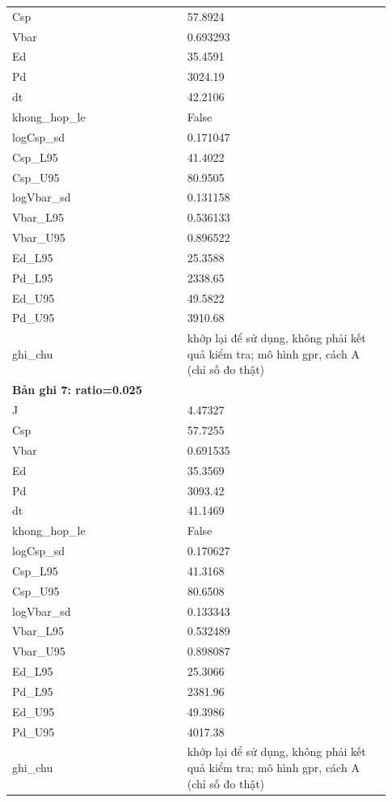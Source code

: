 \begin{longtable}{p{0.43\linewidth}p{0.50\linewidth}}
Csp & 57.8924 \\
Vbar & 0.693293 \\
Ed & 35.4591 \\
Pd & 3024.19 \\
dt & 42.2106 \\
khong\_\allowbreak hop\_\allowbreak le & False \\
logCsp\_\allowbreak sd & 0.171047 \\
Csp\_\allowbreak L95 & 41.4022 \\
Csp\_\allowbreak U95 & 80.9505 \\
logVbar\_\allowbreak sd & 0.131158 \\
Vbar\_\allowbreak L95 & 0.536133 \\
Vbar\_\allowbreak U95 & 0.896522 \\
Ed\_\allowbreak L95 & 25.3588 \\
Pd\_\allowbreak L95 & 2338.65 \\
Ed\_\allowbreak U95 & 49.5822 \\
Pd\_\allowbreak U95 & 3910.68 \\
ghi\_\allowbreak chu & khớp lại để sử dụng, không phải kết quả kiểm tra; mô hình gpr, cách A (chỉ số đo thật) \\
\midrule
\multicolumn{2}{p{0.95\linewidth}}{\textbf{Bản ghi 7: ratio=0.025}} \\
J & 4.47327 \\
Csp & 57.7255 \\
Vbar & 0.691535 \\
Ed & 35.3569 \\
Pd & 3093.42 \\
dt & 41.1469 \\
khong\_\allowbreak hop\_\allowbreak le & False \\
logCsp\_\allowbreak sd & 0.170627 \\
Csp\_\allowbreak L95 & 41.3168 \\
Csp\_\allowbreak U95 & 80.6508 \\
logVbar\_\allowbreak sd & 0.133343 \\
Vbar\_\allowbreak L95 & 0.532489 \\
Vbar\_\allowbreak U95 & 0.898087 \\
Ed\_\allowbreak L95 & 25.3066 \\
Pd\_\allowbreak L95 & 2381.96 \\
Ed\_\allowbreak U95 & 49.3986 \\
Pd\_\allowbreak U95 & 4017.38 \\
ghi\_\allowbreak chu & khớp lại để sử dụng, không phải kết quả kiểm tra; mô hình gpr, cách A (chỉ số đo thật) \\

\end{longtable}
